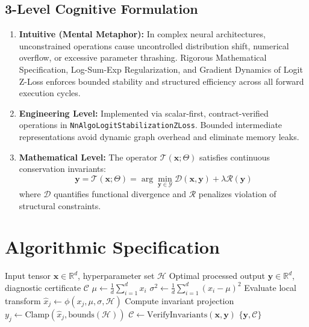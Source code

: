 \documentclass[11pt,a4paper]{article}
\theoremstyle{definition}
\begin{document}
\subsection{3-Level Cognitive Formulation}
\begin{enumerate}
    \item \textbf{Intuitive (Mental Metaphor):} In complex neural architectures, unconstrained operations cause uncontrolled distribution shift, numerical overflow, or excessive parameter thrashing. Rigorous Mathematical Specification, Log-Sum-Exp Regularization, and Gradient Dynamics of Logit Z-Loss enforces bounded stability and structured efficiency across all forward execution cycles.
    \item \textbf{Engineering Level:} Implemented via scalar-first, contract-verified operations in \texttt{NnAlgoLogitStabilizationZLoss}. Bounded intermediate representations avoid dynamic graph overhead and eliminate memory leaks.
    \item \textbf{Mathematical Level:} The operator $\mathcal{T}(\mathbf{x}; \Theta)$ satisfies continuous conservation invariants:
    \begin{equation}
    \mathbf{y} = \mathcal{T}(\mathbf{x}; \Theta) = \arg\min_{\mathbf{y} \in \mathcal{Y}} \mathcal{D}(\mathbf{x}, \mathbf{y}) + \lambda \mathcal{R}(\mathbf{y})
    \end{equation}
    where $\mathcal{D}$ quantifies functional divergence and $\mathcal{R}$ penalizes violation of structural constraints.
\end{enumerate}

\section{Algorithmic Specification}

\begin{algorithm}[H]
\caption{Rigorous Mathematical Specification, Log-Sum-Exp Regularization, and Gradient Dynamics of Logit Z-Loss Forward Pipeline}
\begin{algorithmic}[1]
\Require Input tensor $\mathbf{x} \in \mathbb{R}^d$, hyperparameter set $\mathcal{H}$
\Ensure Optimal processed output $\mathbf{y} \in \mathbb{R}^d$, diagnostic certificate $\mathcal{C}$
\State $\mu \gets \frac{1}{d} \sum_{i=1}^d x_i$
\State $\sigma^2 \gets \frac{1}{d} \sum_{i=1}^d (x_i - \mu)^2$
    \State Evaluate local transform $\hat{x}_j \gets \phi(x_j, \mu, \sigma, \mathcal{H})$
    \State Compute invariant projection $y_j \gets \text{Clamp}(\hat{x}_j, \text{bounds}(\mathcal{H}))$
\EndFor
\State $\mathcal{C} \gets \text{VerifyInvariants}(\mathbf{x}, \mathbf{y})$
\State \Return $\{\mathbf{y}, \mathcal{C}\}$
\end{algorithmic}
\end{algorithm}
\end{document}
